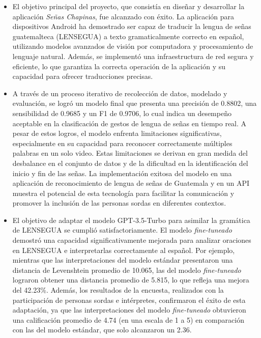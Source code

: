 \begin{itemize}

\item El objetivo principal del proyecto, que consistía en diseñar y desarrollar la aplicación \textit{Señas Chapinas}, fue alcanzado con éxito. La aplicación para dispositivos Android ha demostrado ser capaz de traducir la lengua de señas guatemalteca (LENSEGUA) a texto gramaticalmente correcto en español, utilizando modelos avanzados de visión por computadora y procesamiento de lenguaje natural. Además, se implementó una infraestructura de red segura y eficiente, lo que garantiza la correcta operación de la aplicación y su capacidad para ofrecer traducciones precisas.

\item A través de un proceso iterativo de recolección de datos, modelado y evaluación, se logró un modelo final que presenta una precisión de 0.8802, una sensibilidad de 0.9685 y un F1 de 0.9706, lo cual indica un desempeño aceptable en la clasificación de gestos de lengua de señas en tiempo real. A pesar de estos logros, el modelo enfrenta limitaciones significativas, especialmente en su capacidad para reconocer correctamente múltiples palabras en un solo video. Estas limitaciones se derivan en gran medida del desbalance en el conjunto de datos y de la dificultad en la identificación del inicio y fin de las señas. La implementación exitosa del modelo en una aplicación de reconocimiento de lengua de señas de Guatemala y en un API muestra el potencial de esta tecnología para facilitar la comunicación y promover la inclusión de las personas sordas en diferentes contextos. 
    
\item El objetivo de adaptar el modelo GPT-3.5-Turbo para asimilar la gramática de LENSEGUA se cumplió satisfactoriamente. El modelo \textit{fine-tuneado} demostró una capacidad significativamente mejorada para analizar oraciones en LENSEGUA e interpretarlas correctamente al español. Por ejemplo, mientras que las interpretaciones del modelo estándar presentaron una distancia de Levenshtein promedio de 10.065, las del modelo \textit{fine-tuneado} lograron obtener una distancia promedio de 5.815, lo que refleja una mejora del 42.23\%. Además, los resultados de la encuesta, realizados con la participación de personas sordas e intérpretes, confirmaron el éxito de esta adaptación, ya que las interpretaciones del modelo \textit{fine-tuneado} obtuvieron una calificación promedio de 4.74 (en una escala de 1 a 5) en comparación con las del modelo estándar, que solo alcanzaron un 2.36.
    

\end{itemize}
